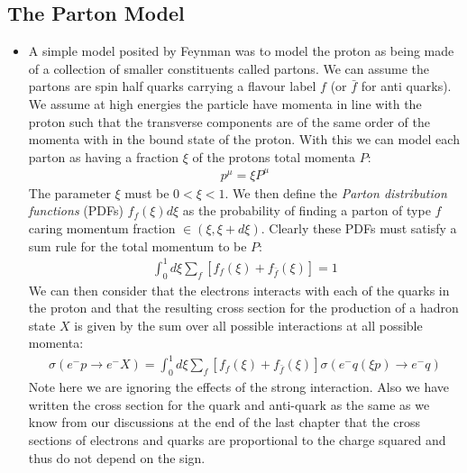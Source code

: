 \documentclass[11pt]{article}
\numberwithin{equation}{section}
\begin{document}
\subsection{The Parton Model} %
\label{sub:the_parton_model}
\begin{itemize}
    \item A simple model posited by Feynman was to model the proton as being made of a collection of smaller constituents called partons. We can assume the partons are spin half quarks carrying a flavour label $f$ (or $\bar{f}$ for anti quarks). We assume at high energies the particle have momenta in line with the proton such that the transverse components are of the same order of the momenta with in the bound state of the proton. With this we can model each parton as having a fraction $\xi$ of the protons total momenta $P$:
    \begin{align*}
        p^{\mu} = \xi P^{\mu}
    \end{align*}
    The parameter $\xi$ must be $0 < \xi < 1$. We then define the \emph{Parton distribution functions} (PDFs) $f_f(\xi)d\xi$ as the probability of finding a parton of type $f$ caring momentum fraction $ \in (\xi,\xi+d\xi)$. Clearly these PDFs must satisfy a sum rule for the total momentum to be $P$: 
    \begin{align*}
        \int_0^1d\xi \sum_f\left[f_f(\xi) + f_{\bar{f}}(\xi)\right] =1
    \end{align*}
    We can then consider that the electrons interacts with each of the quarks in the proton and that the resulting cross section for the production of a hadron state $X$ is given by the sum over all possible interactions at all possible momenta:
    \begin{align*}
        \sigma(e^-p \rightarrow e^-X) = \int_{0}^{1}d\xi\sum_f\left[f_f(\xi)+f_{\bar{f}}(\xi)\right]\sigma(e^-q(\xi p)\rightarrow e^-q)
    \end{align*}
    Note here we are ignoring the effects of the strong interaction. Also we have written the cross section for the quark and anti-quark as the same as we know from our discussions at the end of the last chapter that the cross sections of electrons and quarks are proportional to the charge squared and thus do not depend on the sign.  
\end{itemize}
\end{document}
